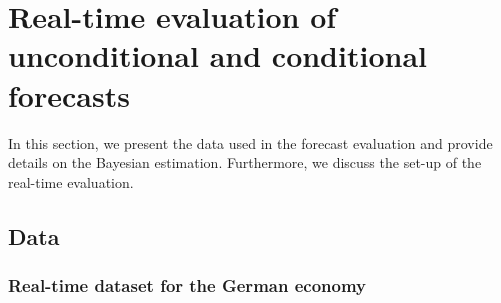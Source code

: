 \documentclass[notitlepage,a4paper,12pt]{article}
\begin{document}

\section{Real-time evaluation of unconditional and conditional forecasts}

In this section, we present the data used in the forecast evaluation and provide details on the Bayesian estimation. Furthermore, we discuss the set-up of the real-time evaluation. 

\subsection{Data}
\subsubsection{Real-time dataset for the German economy}
\end{document}
